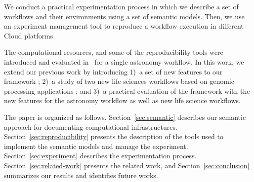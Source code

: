 We conduct a practical experimentation process in which we describe a set 
of workflows and their environments using a set of semantic models. Then, we 
use an experiment management tool to reproduce a workflow execution in different 
Cloud platforms. 






The  computational 
resources, and some of the reproducibility tools were introduced and evaluated 
in~\cite{SantanaPerez-REPPAR-2014} for a single astronomy workflow. In this 
work, we extend our previous work by introducing 1)~a set of new features to 
our framework ; 2)~a study of 
two new life sciences workflows based on genomic processing applications 
; and 3)~a 
practical evaluation of the framework with the new features for the astronomy 
workflow as well as  new life science workflows. 


The paper is organized as follows. Section~\ref{sec:semantic} describes our semantic approach 
for documenting computational infrastructures. Section~\ref{sec:reproducibility} presents the 
description of the tools used to implement the semantic models and manage the experiment. 
Section~\ref{sec:experiment} describes the experimentation process. Section~\ref{sec:related-work} 
presents the related work, and Section~\ref{sec:conclusion} summarizes our results and 
identifies future works.


